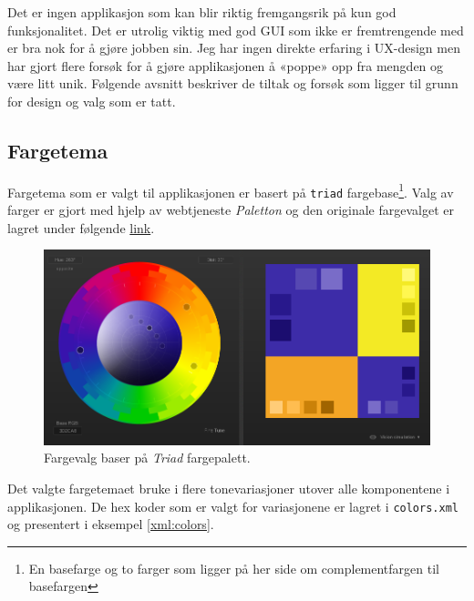 Det er ingen applikasjon som kan blir riktig fremgangsrik på kun god funksjonalitet. Det er utrolig viktig med god GUI som ikke er fremtrengende med er bra nok for å gjøre jobben sin. Jeg har ingen direkte erfaring i UX-design men har gjort flere forsøk for å gjøre applikasjonen å «poppe» opp fra mengden og være litt unik. Følgende avsnitt beskriver de tiltak og forsøk som ligger til grunn for design og valg som er tatt.

\subsection{Fargetema} \label{sub:farger}
Fargetema som er valgt til applikasjonen er basert på \texttt{triad} fargebase\footnote{En basefarge og to farger som ligger på her side om complementfargen til basefargen}. Valg av farger er gjort med hjelp av webtjeneste \textit{Paletton} og den originale fargevalget er lagret under følgende \href{http://paletton.com/#uid=3470u0krausgVEBm0wFuzpjybk1}{link}.

\begin{figure}[ht]
\centering
 \includegraphics[scale=0.25]{./img/gui/4.png}
 \caption{Fargevalg baser på \textit{Triad} fargepalett.}
 \label{fig:gui_colors}
\end{figure}


Det valgte fargetemaet bruke i flere tonevariasjoner utover alle komponentene i applikasjonen. De hex koder som er valgt for variasjonene er lagret i \texttt{colors.xml} og presentert i eksempel \ref{xml:colors}.

